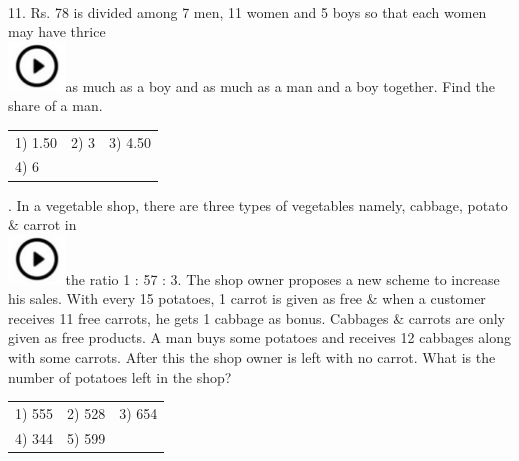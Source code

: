 \documentclass{article}
\begin{document}
\noindent 

\noindent 

\noindent \\   

11. Rs. 78 is divided among 7 men, 11 women and 5 boys so that each women may have thrice  
	\noindent \\ \includegraphics*[width=0.60in, height=0.52in]{images/image1}as much as a boy and as much as a man and a boy together. Find the share of a man.

\noindent \begin{tabular}{p{1.7in} p{1.6in} p{1.6in}} \\ 
 1) 1.50                     &  2) 3                   &  3) 4.50              \\
4) 6 \\
\end{tabular}
\newpage
{}. In a vegetable shop, there are three types of vegetables namely, cabbage, potato \& carrot in  
	\noindent \\ \includegraphics*[width=0.60in, height=0.52in]{images/image1}the ratio 1 : 57 : 3. The shop owner proposes a new scheme to increase his sales. With every 15 potatoes, 1 carrot is given as free \& when a customer receives 11 free carrots, he gets 1 cabbage as bonus. Cabbages \& carrots are only given as free products. A man buys some potatoes and receives 12 cabbages along with some carrots. After this the shop owner is left with no carrot. What is the number of potatoes left in the shop?

\noindent 

\noindent \begin{tabular}{p{1.7in} p{1.6in} p{1.6in}} \\ 
 1) 555                      &  2) 528               &  3) 654               \\
4) 344               & 5) 599 \\
\end{tabular}

\noindent 

\noindent 

\noindent  \\  
\end{document}
